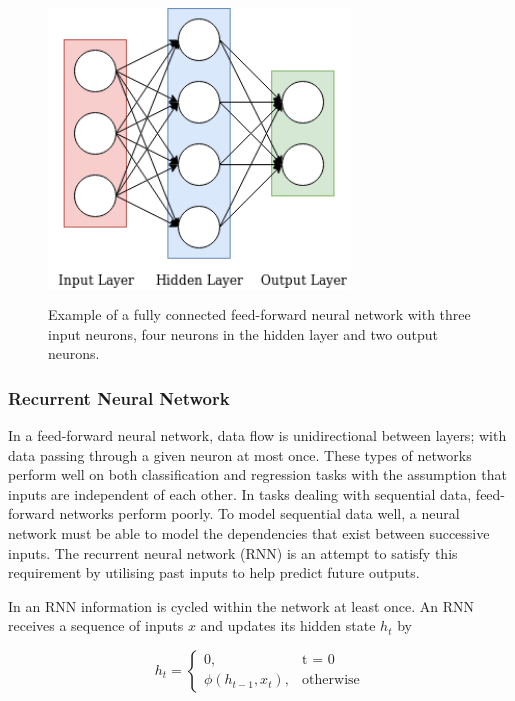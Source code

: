 \begin{figure}[h]
	\includegraphics[width=8cm, height=8cm]{./figures/fig2}
	\centering
	\caption[Example fully connected feed-forward neural network]{Example of a fully connected feed-forward neural network with three input neurons, four neurons in the hidden layer and two output neurons.}
	\label{fig:fig2}
\end{figure}

\subsubsection{Recurrent Neural Network}
In a feed-forward neural network, data flow is unidirectional between layers; with data passing through a given neuron at most once. These types of networks perform well on both classification and regression tasks with the assumption that inputs are independent of each other. In tasks dealing with sequential data, feed-forward networks perform poorly. To model sequential data well, a neural network must be able to model the dependencies that exist between successive inputs. The recurrent neural network (RNN) is an attempt to satisfy this requirement by utilising past inputs to help predict future outputs.
\par
\noindent
\newline
In an RNN information is cycled within the network at least once.  An RNN receives a sequence of inputs \(x\) and updates its hidden state \(h_{t}\) by 

\begin{equation}
	h_{t}=
	\begin{cases}
	 0, & \text{t = 0} \\
	 \phi{(h_{t-1}, x_{t})}, & \text{otherwise}
	\end{cases}
\end{equation}

